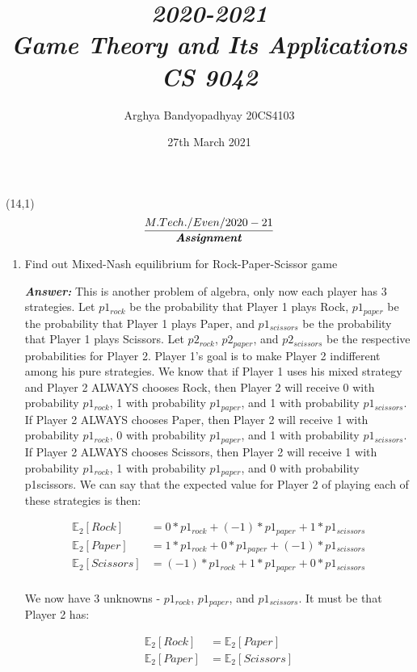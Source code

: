\documentclass[15pt]{article}
\title{\emph{2020-2021\\Game Theory and Its Applications\\CS 9042}}
\author{
Arghya Bandyopadhyay 20CS4103
}
\date{27th March 2021}
\begin{document}
\begin{textblock}{5}(14,1)
\noindent\Large \[\frac{M.Tech./Even/2020-21}{\textbf{\emph{Assignment}}}\]
\end{textblock}
\maketitle
\begin{enumerate}
\item
Find out Mixed-Nash equilibrium for Rock-Paper-Scissor game

\textbf{\emph{Answer: }}
This is another problem of algebra, only now each player has 3 strategies. Let $p1_{rock}$ be the probability that
Player 1 plays Rock, $p1_{paper}$ be the probability that Player 1 plays Paper, and $p1_{scissors}$ be the probability
that Player 1 plays Scissors. Let $p2_{rock}$, $p2_{paper}$, and $p2_{scissors}$ be the respective probabilities for Player 2.
Player 1's goal is to make Player 2 indifferent among his pure strategies. We know that if Player 1 uses his
mixed strategy and Player 2 ALWAYS chooses Rock, then Player 2 will receive 0 with probability $p1_{rock}$, 1
with probability $p1_{paper}$, and 1 with probability $p1_{scissors}$. If Player 2 ALWAYS chooses Paper, then Player
2 will receive 1 with probability $p1_{rock}$, 0 with probability $p1_{paper}$, and 1 with probability $p1_{scissors}$. If
Player 2 ALWAYS chooses Scissors, then Player 2 will receive 1 with probability $p1_{rock}$, 1 with probability
$p1_{paper}$, and 0 with probability p1scissors. We can say that the expected value for Player 2 of playing each
of these strategies is then:

\begin{equation} \label{eq1}
\begin{split}
\mathbb{E}_2[Rock] & = 0*p1_{rock}+(-1)*p1_{paper}+1*p1_{scissors}\\
\mathbb{E}_2[Paper] & = 1*p1_{rock}+0*p1_{paper}+(-1)*p1_{scissors}\\
\mathbb{E}_2[Scissors] & = (-1)*p1_{rock}+1*p1_{paper}+0*p1_{scissors}\\
\end{split}
\end{equation}

We now have 3 unknowns - $p1_{rock}$, $p1_{paper}$, and $p1_{scissors}$. It must be that Player 2 has:

\begin{equation} \label{eq2}
\begin{split}
\mathbb{E}_2[Rock] & =\mathbb{E}_2[Paper]\\
\mathbb{E}_2[Paper] & =\mathbb{E}_2[Scissors]\\
\end{split}
\end{equation}


\end{enumerate}
\end{document}
